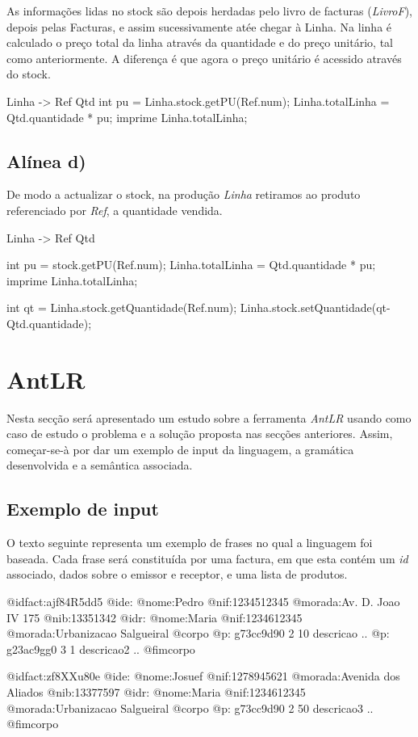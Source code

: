 \documentclass[11pt,a4paper]{article}
\begin{document}
As informações lidas no stock são depois herdadas pelo livro de facturas (\textit{LivroF}), depois pelas Facturas, e assim sucessivamente atée chegar à Linha.
Na linha é calculado o preço total da linha através da quantidade e do preço unitário, tal como anteriormente. A diferença é que agora o preço unitário é acessido através do stock.

\begin{code_txt}
Linha -> Ref Qtd {
int pu = Linha.stock.getPU(Ref.num);
Linha.totalLinha = Qtd.quantidade * pu;
imprime Linha.totalLinha;
}
\end{code_txt}


\subsection{Alínea d)}
De modo a actualizar o stock, na produção \textit{Linha} retiramos ao produto referenciado por \textit{Ref}, a quantidade vendida.

\begin{code_txt}
Linha -> Ref Qtd {
int pu = stock.getPU(Ref.num);
  Linha.totalLinha = Qtd.quantidade * pu;
imprime Linha.totalLinha;

int qt = Linha.stock.getQuantidade(Ref.num);
Linha.stock.setQuantidade(qt-Qtd.quantidade);
}
\end{code_txt}

\newpage

\section{AntLR}
Nesta secção será apresentado um estudo sobre a ferramenta \emph{AntLR} usando como caso de estudo 
o problema e a solução proposta nas secções anteriores. Assim, começar-se-à por dar um exemplo de input da linguagem, a gramática desenvolvida 
e a semântica associada.
\subsection{Exemplo de input}

O texto seguinte representa um exemplo de frases no qual a linguagem foi baseada. Cada frase será constituída por uma factura, em que esta contém 
um \emph{id} associado, dados sobre o emissor e receptor, e uma lista de produtos.

\begin{code_txt}
 @idfact:ajf84R5dd5
	@ide:
		@nome:Pedro
		@nif:1234512345
		@morada:Av. D. Joao IV 175
		@nib:13351342
	@idr:
		@nome:Maria
		@nif:1234612345
		@morada:Urbanizacao Salgueiral
	@corpo
		@p:
		g73cc9d90
		2
		10
		descricao ..
		@p:
		g23ac9gg0
		3
		1
		descricao2 ..
	@fimcorpo

@idfact:zf8XXu80e
	@ide:
		@nome:Josuef
		@nif:1278945621
		@morada:Avenida dos Aliados
		@nib:13377597
	@idr:
		@nome:Maria
		@nif:1234612345
		@morada:Urbanizacao Salgueiral
	@corpo
		@p:
		g73cc9d90
		2
		50
		descricao3 ..
	@fimcorpo
\end{code_txt}
\end{document}
